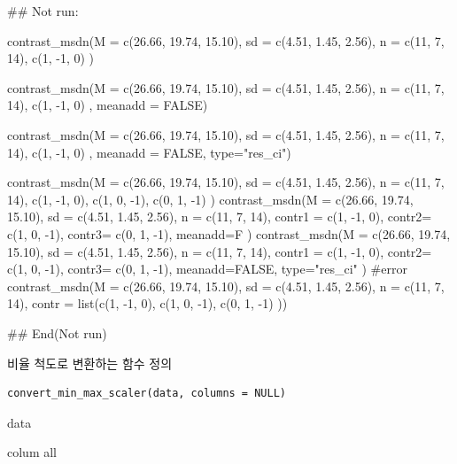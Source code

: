 \documentclass[a4paper]{book}
\begin{document}
%
\begin{Examples}
\begin{ExampleCode}
\#\# Not run: 


contrast_msdn(M = c(26.66, 19.74, 15.10),
              sd = c(4.51, 1.45, 2.56),
              n = c(11, 7, 14),
              c(1, -1, 0) )

contrast_msdn(M = c(26.66, 19.74, 15.10),
              sd = c(4.51, 1.45, 2.56),
              n = c(11, 7, 14),
              c(1, -1, 0) ,
              meanadd = FALSE)

contrast_msdn(M = c(26.66, 19.74, 15.10),
              sd = c(4.51, 1.45, 2.56),
              n = c(11, 7, 14),
              c(1, -1, 0) ,
             meanadd = FALSE,
              type="res_ci")


contrast_msdn(M = c(26.66, 19.74, 15.10),
              sd = c(4.51, 1.45, 2.56),
             n = c(11, 7, 14),
              c(1, -1,  0),
              c(1,  0, -1),
              c(0,  1, -1)
)
contrast_msdn(M = c(26.66, 19.74, 15.10),
              sd = c(4.51, 1.45, 2.56),
              n = c(11, 7, 14),
              contr1 = c(1, -1,  0),
              contr2= c(1,  0, -1),
              contr3= c(0,  1, -1),
              meanadd=F
)
contrast_msdn(M = c(26.66, 19.74, 15.10),
              sd = c(4.51, 1.45, 2.56),
              n = c(11, 7, 14),
             contr1 = c(1, -1,  0),
             contr2= c(1,  0, -1),
              contr3= c(0,  1, -1),
              meanadd=FALSE, type="res_ci"
)
#error
contrast_msdn(M = c(26.66, 19.74, 15.10),
              sd = c(4.51, 1.45, 2.56),
             n = c(11, 7, 14),
              contr = list(c(1, -1,  0),
                            c(1,  0, -1),
                           c(0,  1, -1)
              ))



## End(Not run)
\end{ExampleCode}
\end{Examples}
%
\begin{Description}
비율 척도로 변환하는 함수 정의
\end{Description}
%
\begin{Usage}
\begin{verbatim}
convert_min_max_scaler(data, columns = NULL)
\end{verbatim}
\end{Usage}
%
\begin{Arguments}
\begin{ldescription}
\item[\code{data}] data

\item[\code{columns}] colum all
\end{ldescription}
\end{Arguments}
\end{document}
